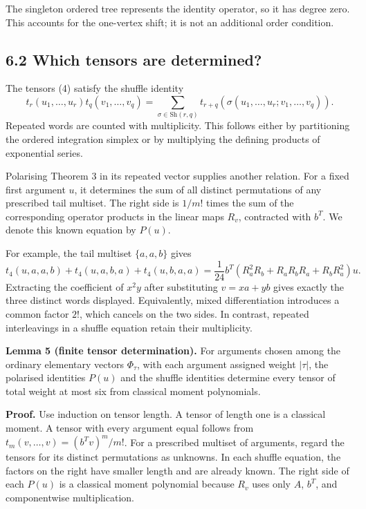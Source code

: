 \documentclass[
  11pt,
  a4paper,
]{scrartcl}
\begin{document}
The singleton ordered tree represents the identity operator, so it has
degree zero. This accounts for the one-vertex shift; it is not an
additional order condition.

\subsection{6.2 Which tensors are
determined?}\label{which-tensors-are-determined}

The tensors (4) satisfy the shuffle identity \[
t_r(u_1,\ldots,u_r)t_q(v_1,\ldots,v_q)
=\sum_{\sigma\in\mathrm{Sh}(r,q)}t_{r+q}(\sigma(u_1,\ldots,u_r;v_1,\ldots,v_q)).
\tag{S}
\] Repeated words are counted with multiplicity. This follows either by
partitioning the ordered integration simplex or by multiplying the
defining products of exponential series.

Polarising Theorem 3 in its repeated vector supplies another relation.
For a fixed first argument \(u\), it determines the sum of all distinct
permutations of any prescribed tail multiset. The right side is \(1/m!\)
times the sum of the corresponding operator products in the linear maps
\(R_v\), contracted with \(b^T\). We denote this known equation by
\(P(u)\).

For example, the tail multiset \(\{a,a,b\}\) gives \[
t_4(u,a,a,b)+t_4(u,a,b,a)+t_4(u,b,a,a)
=\frac1{24}b^T(R_a^2R_b+R_aR_bR_a+R_bR_a^2)u.
\] Extracting the coefficient of \(x^2y\) after substituting \(v=xa+yb\)
gives exactly the three distinct words displayed. Equivalently, mixed
differentiation introduces a common factor \(2!\), which cancels on the
two sides. In contrast, repeated interleavings in a shuffle equation
retain their multiplicity.

\textbf{Lemma 5 (finite tensor determination).} For arguments chosen
among the ordinary elementary vectors \(\Phi_\tau\), with each argument
assigned weight \(|\tau|\), the polarised identities \(P(u)\) and the
shuffle identities determine every tensor of total weight at most six
from classical moment polynomials.

\textbf{Proof.} Use induction on tensor length. A tensor of length one
is a classical moment. A tensor with every argument equal follows from
\(t_m(v,\ldots,v)=(b^Tv)^m/m!\). For a prescribed multiset of arguments,
regard the tensors for its distinct permutations as unknowns. In each
shuffle equation, the factors on the right have smaller length and are
already known. The right side of each \(P(u)\) is a classical moment
polynomial because \(R_v\) uses only \(A\), \(b^T\), and componentwise
multiplication.
\end{document}
